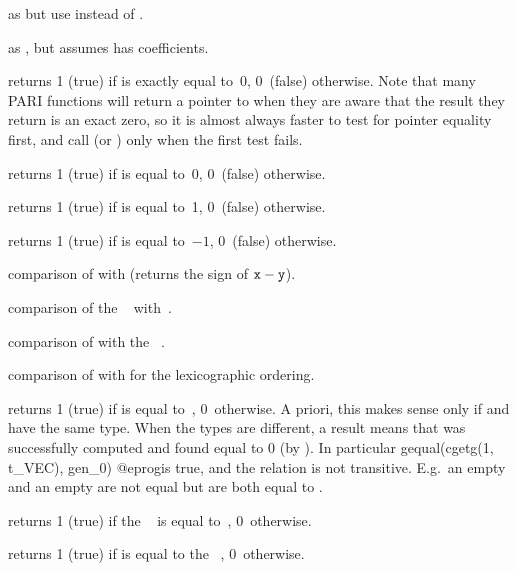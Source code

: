  as 
but use  instead of .

 as , but assumes
 has  coefficients.


 returns 1 (true) if  is exactly equal
to~0, 0~(false) otherwise. Note that many PARI functions will return a
pointer to  when they are aware that the result they return is an
exact zero, so it is almost always faster to test for pointer equality first,
and call  (or ) only when the first test fails.

 returns 1 (true) if  is equal to~0, 0~(false)
otherwise.

 returns 1 (true) if  is equal to~1, 0~(false)
otherwise.

 returns 1 (true) if  is equal to~$-1$,
0~(false) otherwise.

 comparison of  with  (returns
the sign of ${\tt x}-{\tt y}$).

 comparison of the ~
with~.

 comparison of  with the
~.

 comparison of  with  for the
lexicographic ordering.

 returns 1 (true) if  is equal
to~, 0~otherwise. A priori, this makes sense only if  and
 have the same type. When the types are different, a  result
means that  was successfully computed and found equal to $0$
(by ). In particular
\bprog
  gequal(cgetg(1, t_VEC), gen_0)
@eprog\noindent is true, and the relation is not transitive. E.g.~an empty
 and an empty  are not equal but are both equal to
.

 returns 1 (true) if the ~
is equal to~, 0~otherwise.

 returns 1 (true) if  is equal to
the ~, 0~otherwise.


